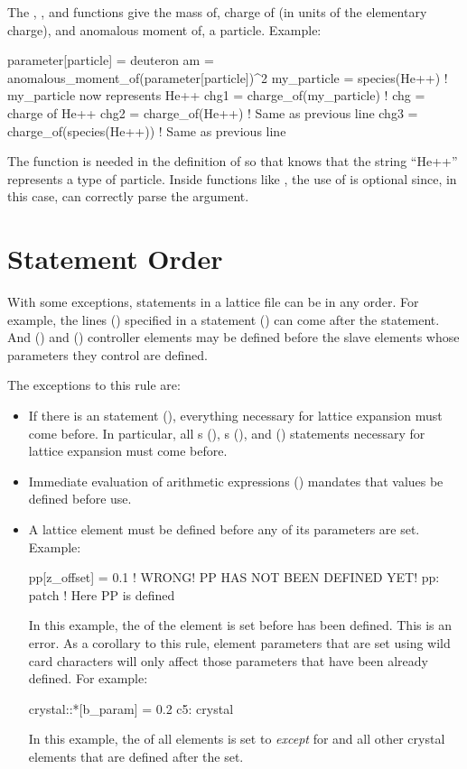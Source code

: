 {{{The , , and  functions give the mass of,
charge of (in units of the elementary charge), and anomalous moment of, a particle.
Example:
\begin{example}
  parameter[particle] = deuteron
  am = anomalous_moment_of(parameter[particle])^2
  my_particle = species(He++)      ! my_particle now represents He++
  chg1 = charge_of(my_particle)    ! chg = charge of He++
  chg2 = charge_of(He++)           ! Same as previous line
  chg3 = charge_of(species(He++))  ! Same as previous line
\end{example}
The  function is needed in the definition of  so that \bmad knows that
the string ``He++'' represents a type of particle. Inside functions like , the use of
 is optional since, in this case, \bmad can correctly parse the argument.

\section{Statement Order}
\label{s:state.order}

With some exceptions, statements in a lattice file can be in any order. For example, the lines
() specified in a  statement () can come after the 
statement. And  () and  () controller elements
may be defined before the slave elements whose parameters they control are defined.

The exceptions to this rule are:
\begin{itemize}
\item 
If there is an  statement (), everything necessary for
lattice expansion must come before. In particular, all s
(), s (), and  () statements
necessary for lattice expansion must come before.
\item
Immediate evaluation of arithmetic expressions () mandates that values be defined
before use.
\item
A lattice element must be defined before any of its parameters are set. Example:
\begin{example2}
  pp[z_offset] = 0.1    ! WRONG! PP HAS NOT BEEN DEFINED YET!
  pp: patch             ! Here PP is defined
\end{example2}
In this example, the  of the element  is set before  has been
defined. This is an error. As a corollary to this rule, element parameters that are set 
using wild card characters will only affect those parameters that have been already defined. For
example:
\begin{example2}
  crystal::*[b_param] = 0.2
  c5: crystal
\end{example2}
In this example, the  of all  elements is set to  {\em except} for
 and all other crystal elements that are defined after the set.
\end{itemize}

}}}
